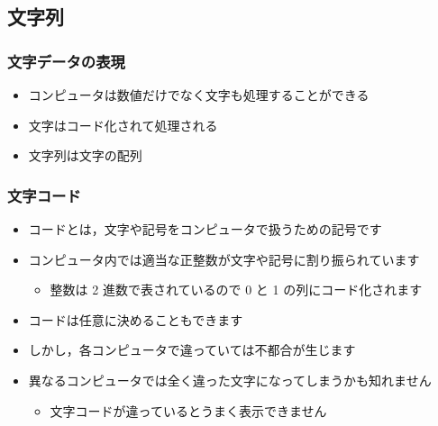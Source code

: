 \subsection{文字列}
\begin{frame}
\frametitle{文字データの表現}
  \begin{itemize}
\item コンピュータは数値だけでなく文字も処理することができる
\item 文字はコード化されて処理される
\item 文字列は文字の配列
  \end{itemize}
\end{frame}
\begin{frame}
\frametitle{文字コード}
  \begin{itemize}
\item コードとは，文字や記号をコンピュータで扱うための記号です
\item コンピュータ内では適当な正整数が文字や記号に割り振られています
    \begin{itemize}
\item 整数は 2 進数で表されているので 0 と 1 の列にコード化されます
    \end{itemize}
\item コードは任意に決めることもできます
\item しかし，各コンピュータで違っていては不都合が生じます
\item 異なるコンピュータでは全く違った文字になってしまうかも知れません
    \begin{itemize}
\item 文字コードが違っているとうまく表示できません
    \end{itemize}
  \end{itemize}
\end{frame}
